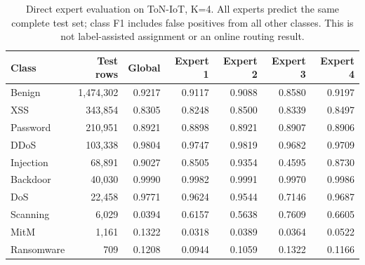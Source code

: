 \begin{table}[H]
\centering
\small
\caption{Direct expert evaluation on ToN-IoT, K=4. All experts predict the same complete test set; class F1 includes false positives from all other classes. This is not label-assisted assignment or an online routing result.}
\label{tab:experts_toniot}
\begin{tabular}{lrrrrrr}
\toprule
Class & Test rows & Global & Expert 1 & Expert 2 & Expert 3 & Expert 4 \\
\midrule
Benign & 1,474,302 & 0.9217 & 0.9117 & 0.9088 & 0.8580 & 0.9197 \\
XSS & 343,854 & 0.8305 & 0.8248 & 0.8500 & 0.8339 & 0.8497 \\
Password & 210,951 & 0.8921 & 0.8898 & 0.8921 & 0.8907 & 0.8906 \\
DDoS & 103,338 & 0.9804 & 0.9747 & 0.9819 & 0.9682 & 0.9709 \\
Injection & 68,891 & 0.9027 & 0.8505 & 0.9354 & 0.4595 & 0.8730 \\
Backdoor & 40,030 & 0.9990 & 0.9982 & 0.9991 & 0.9970 & 0.9986 \\
DoS & 22,458 & 0.9771 & 0.9624 & 0.9544 & 0.7146 & 0.9687 \\
Scanning & 6,029 & 0.0394 & 0.6157 & 0.5638 & 0.7609 & 0.6605 \\
MitM & 1,161 & 0.1322 & 0.0318 & 0.0389 & 0.0364 & 0.0522 \\
Ransomware & 709 & 0.1208 & 0.0944 & 0.1059 & 0.1322 & 0.1166 \\
\bottomrule
\end{tabular}
\end{table}
